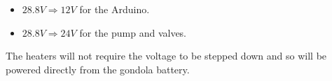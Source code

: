 \begin{centering}
\begin{itemize}
  \item $28.8V \Longrightarrow 12V$ for the Arduino.  
  \item $28.8V \Longrightarrow 24V$ for the pump and valves.
  \end{itemize}

\end{centering}
\bigskip

\begin{centering}
The heaters will not require the voltage to be stepped down and so will be powered directly from the gondola battery.
\end{centering}
\bigskip


\raggedbottom
